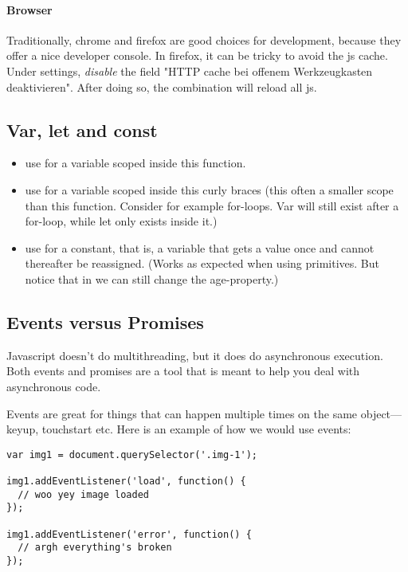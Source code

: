 \paragraph{Browser} Traditionally, chrome and firefox are good choices for development, because they offer a nice developer console. In firefox, it can be tricky to avoid the js cache. Under settings, \emph{disable} the field "HTTP cache bei offenem Werkzeugkasten deaktivieren". After doing so, the combination  will reload all js. 




\subsection{Var, let and const}
\begin{itemize}
    \item use  for a variable scoped inside this function. 
    \item use  for a variable scoped inside this curly braces (this often a smaller scope than this function. Consider for example for-loops. Var will still exist after a for-loop, while let only exists inside it.) 
    \item use  for a constant, that is, a variable that gets a value once and cannot  thereafter be reassigned. (Works as expected when using primitives. But notice that in  we can still change the age-property.)
\end{itemize}


\subsection{Events versus Promises}
Javascript doesn't do multithreading, but it does do asynchronous execution. Both events and promises are a tool that is meant to help you deal with asynchronous code. 

Events are great for things that can happen multiple times on the same object—keyup, touchstart etc. Here is an example of how we would use events: 
\begin{lstlisting}
var img1 = document.querySelector('.img-1');

img1.addEventListener('load', function() {
  // woo yey image loaded
});

img1.addEventListener('error', function() {
  // argh everything's broken
});

\end{lstlisting}

